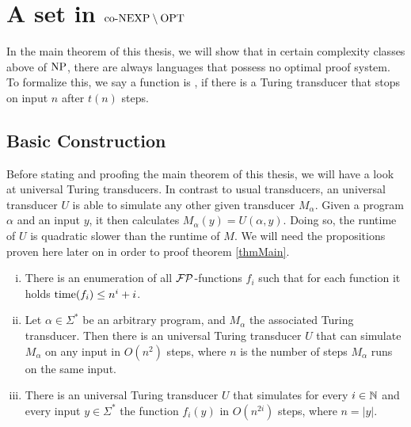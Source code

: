 \chapter{A set in $\text{co-NEXP} \setminus \text{OPT}$} \label{chpConexpMinusOpt}
  In the main theorem of this thesis, we will show that in certain complexity classes above of \(\text{NP}\), there are always languages that possess no optimal proof system. To formalize this, we say a function is , if there is a Turing transducer that stops on input \(n\) after \(t(n)\) steps.

  \section{Basic Construction}
  
  Before stating and proofing the main theorem of this thesis, we will have a look at universal Turing transducers. In contrast to usual transducers, an universal transducer \(U\) is able to simulate any other given transducer \(M_\alpha\). Given a program \(\alpha\) and an input \(y\), it then calculates \(M_\alpha(y) = U(\alpha, y)\). Doing so, the runtime of \(U\) is quadratic slower than the runtime of \(M\). We will need the propositions proven here later on in order to proof theorem \ref{thmMain}.
  
  \begin{lemma}\label{lemSimulation}
    \begin{enumerate}[(i)]
     \item There is an enumeration of all \(\mathcal{FP}\)-functions \(f_i\) such that for each function it holds \(\operatorname{time}(f_i) \leq n^i + i\).
     \item Let \(\alpha \in \Sigma^*\) be an arbitrary program, and \(M_\alpha\) the associated Turing transducer. Then there is an universal Turing transducer \(U\) that can simulate \(M_\alpha\) on any input in \(O(n^2)\) steps, where \(n\) is the number of steps \(M_\alpha\) runs on the same input.
     \item There is an universal Turing transducer \(U\) that simulates for every \(i \in \mathbb{N}\) and every input \(y \in \Sigma^*\) the function \(f_i(y)\) in \(O(n^{2i})\) steps, where \(n = |y|\).
    \end{enumerate}
  \end{lemma}
  
